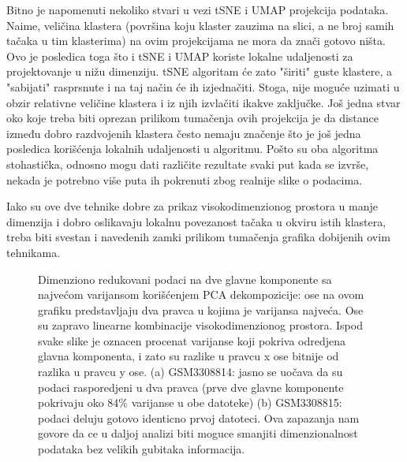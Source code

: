 \documentclass{article}
\begin{document}
Bitno je napomenuti nekoliko stvari u vezi tSNE i UMAP projekcija podataka. Naime, veličina klastera (površina koju klaster zauzima na slici, a ne broj samih tačaka u tim klasterima) na ovim projekcijama ne mora da znači gotovo ništa. Ovo je posledica toga što i tSNE i UMAP koriste lokalne udaljenosti za projektovanje u nižu dimenziju. tSNE algoritam će zato "širiti" guste klastere, a "sabijati" rasprsnute i na taj način će ih izjednačiti. Stoga, nije moguće uzimati u obzir relativne veličine klastera i iz njih izvlačiti ikakve zaključke. Još jedna stvar oko koje treba biti oprezan prilikom tumačenja ovih projekcija je da distance između dobro razdvojenih klastera često nemaju značenje što je još jedna posledica korišćenja lokalnih udaljenosti u algoritmu. Pošto su oba algoritma stohastička, odnosno mogu dati različite rezultate svaki put kada se izvrše, nekada je potrebno više puta ih pokrenuti zbog realnije slike o podacima.

Iako su ove dve tehnike dobre za prikaz visokodimenzionog prostora u manje dimenzija i dobro oslikavaju lokalnu povezanost tačaka u okviru istih klastera, treba biti svestan i navedenih zamki prilikom tumačenja grafika dobijenih ovim tehnikama. 

\begin{figure}[H]
    \centering
    \caption{ Dimenziono redukovani podaci na dve glavne komponente sa najvećom varijansom korišćenjem PCA dekompozicije: ose na ovom grafiku predstavljaju dva pravca u kojima je varijansa najveća. Ose su zapravo linearne kombinacije visokodimenzionog prostora. Ispod svake slike je oznacen procenat varijanse koji pokriva odredjena glavna komponenta, i zato su razlike u pravcu x ose bitnije od razlika u pravcu y ose. (a) GSM3308814: jasno se uočava da su podaci rasporedjeni u dva pravca (prve dve glavne komponente pokrivaju oko 84\% varijanse u obe datoteke) (b) GSM3308815: podaci deluju gotovo identicno prvoj datoteci. Ova zapazanja nam govore da ce u daljoj analizi biti moguce smanjiti dimenzionalnost podataka bez velikih gubitaka informacija. }
    \label{fig:pca_HVG_group_1}
\end{figure}
\end{document}
